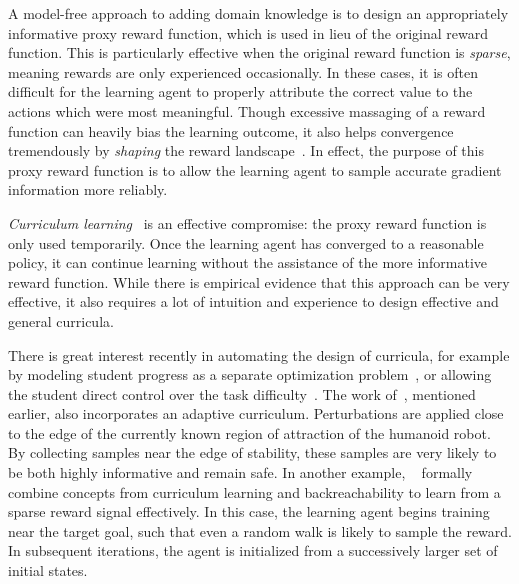 A model-free approach to adding domain knowledge is to design an appropriately informative proxy reward function, which is used in lieu of the original reward function. This is particularly effective when the original reward function is \emph{sparse}, meaning rewards are only experienced occasionally. In these cases, it is often difficult for the learning agent to properly attribute the correct value to the actions which were most meaningful.
Though excessive massaging of a reward function can heavily bias the learning outcome, it also helps convergence tremendously by \emph{shaping} the reward landscape~\cite{gullapalli1992shaping,randlov1998learning}.
In effect, the purpose of this proxy reward function is to allow the learning agent to sample accurate gradient information more reliably. \par
\emph{Curriculum learning}~\cite{bengio2009curriculum,karpathy2012curriculum,heim2018shaping} is an effective compromise: the proxy reward function is only used temporarily. Once the learning agent has converged to a reasonable policy, it can continue learning without the assistance of the more informative reward function.
While there is empirical evidence that this approach can be very effective, it also requires a lot of intuition and experience to design effective and general curricula. \par
There is great interest recently in automating the design of curricula, for example by modeling student progress as a separate optimization problem~\cite{portelas2019teacher}, or allowing the student direct control over the task difficulty~\cite{klink2019self}. The work of~\textcite{kumar2018improving}, mentioned earlier, also incorporates an adaptive curriculum.
Perturbations are applied close to the edge of the currently known region of attraction of the humanoid robot. By collecting samples near the edge of stability, these samples are very likely to be both highly informative and remain safe.
In another example, ~\textcite{ivanovic2019barc} formally combine concepts from curriculum learning and backreachability to learn from a sparse reward signal effectively.
In this case, the learning agent begins training near the target goal, such that even a random walk is likely to sample the reward. In subsequent iterations, the agent is initialized from a successively larger set of initial states.
